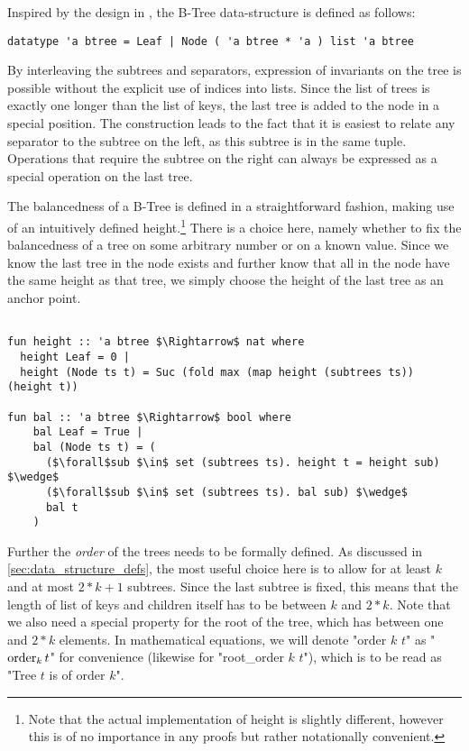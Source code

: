 
Inspired by the design in \parencite{DBLP:conf/popl/MalechaMSW10}, the B-Tree data-structure is defined as follows:

\begin{lstlisting}[mathescape=true, language=Isabelle,label=lst:btree-def]
datatype 'a btree = Leaf | Node ( 'a btree * 'a ) list 'a btree
\end{lstlisting}

By interleaving the subtrees and separators, expression of invariants
on the tree is possible without the explicit use of indices into lists.
Since the list of trees is exactly one longer than the list of keys,
the last tree is added to the node in a special position.
The construction leads to the fact that it is easiest to relate any separator
to the subtree on the left, as this subtree is in the same tuple.
Operations that require the subtree on the right can always be expressed as a special
operation on the last tree.

The balancedness of a B-Tree is defined in a straightforward fashion, making use
of an intuitively defined height.\footnote{
    Note that the actual implementation of height is slightly different,
    however this is of no importance in any proofs but rather notationally convenient.
}
There is a choice here, namely whether to fix the balancedness of a tree
on some arbitrary number or on a known value.
Since we know the last tree in the node exists and further
know that all in the node have the same height as that tree,
we simply choose the height of the last tree as an anchor point.

\begin{lstlisting}[mathescape=true, language=Isabelle]

fun height :: 'a btree $\Rightarrow$ nat where
  height Leaf = 0 |
  height (Node ts t) = Suc (fold max (map height (subtrees ts)) (height t))

fun bal :: 'a btree $\Rightarrow$ bool where
    bal Leaf = True |
    bal (Node ts t) = (
      ($\forall$sub $\in$ set (subtrees ts). height t = height sub) $\wedge$
      ($\forall$sub $\in$ set (subtrees ts). bal sub) $\wedge$
      bal t
    )
\end{lstlisting}

Further the \textit{order} of the trees needs to be formally defined.
As discussed in \autoref{sec:data_structure_defs}, the most useful choice here is
to allow for at least $k$ and at most $2*k+1$ subtrees.
Since the last subtree is fixed, this means that the length of list of keys and children
itself has to be between $k$ and $2*k$.
Note that we also need a special property for the root of the tree,
which has between one and $2*k$ elements.
In mathematical equations, we will denote "order $k$ $t$" as "$\operatorname{order}_k t$"
for convenience (likewise for "root\_order $k$ $t$"), which is to be read as
"Tree $t$ is of order $k$".

